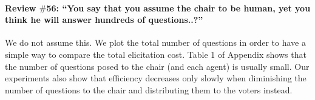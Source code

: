 \documentclass{article}
\begin{document}
\paragraph{Review $\#$56: “You say that you assume the chair to be human, yet you think he will answer hundreds of questions..?”}
We do not assume this. We plot the total number of questions in order to have a simple way to compare the total elicitation cost. 
Table 1 of Appendix shows that the number of questions posed to the chair (and each agent) is usually small. Our experiments also show that efficiency decreases only slowly when diminishing the number of questions to the chair and distributing them to the voters instead.
\end{document}
